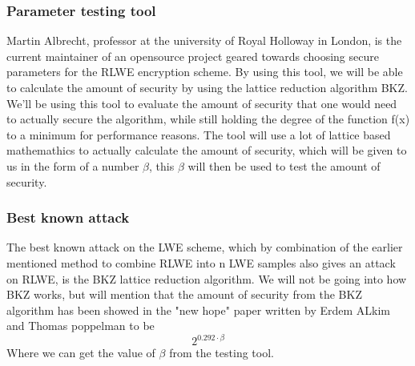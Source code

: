 \documentclass[../main.tex]{subfiles}
\begin{document}
    \subsubsection{Parameter testing tool}
        Martin Albrecht, professor at the university of Royal Holloway in London, is the current maintainer of an
		opensource project geared towards choosing secure parameters for the RLWE encryption scheme.
		By using this tool, we will be able to calculate the amount of security by using the lattice reduction algorithm BKZ.
		We'll be using this tool to evaluate the amount of security that one would need to actually secure the algorithm,
		while still holding the degree of the function f(x) to a minimum for performance reasons.
		The tool will use a lot of lattice based mathemathics to actually calculate the amount of security, which will be given
		to us in the form of a number $\beta$, this $\beta$ will then be used to test the amount of security.

    \subsubsection{Best known attack}
		The best known attack on the LWE scheme, which by combination of the earlier mentioned method to combine RLWE
		into n LWE samples also gives an attack on RLWE, is the BKZ lattice reduction algorithm.
		We will not be going into how BKZ works, but will mention that the amount of security from the BKZ algorithm
		has been showed in the "new hope" paper \cite{} written by Erdem ALkim and Thomas poppelman to be
		$$ 2^{0.292 \cdot \beta} $$ 
		Where we can get the value of $\beta$ from the testing tool.
\end{document}
